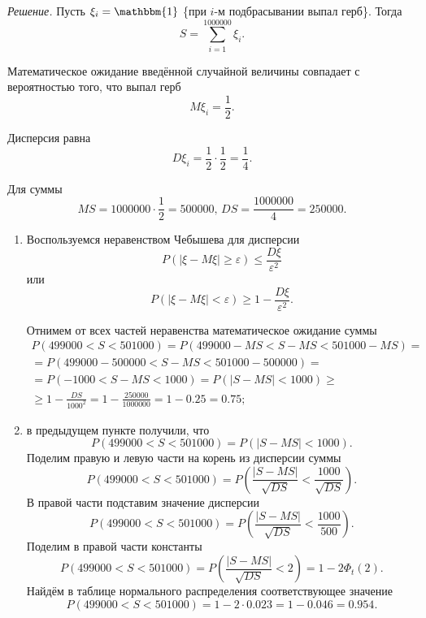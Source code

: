 \textit{Решение.} Пусть $ \xi_i = \mathbbm{1}$ \{при $i$-м подбрасывании выпал герб\}.
Тогда
$$S =
  \sum \limits_{i = 1}^{1000000} \xi_i.$$

Математическое ожидание введённой случайной величины совпадает с вероятностью того, что выпал герб
$$M \xi_i =
  \frac{1}{2}.$$

Дисперсия равна
$$D \xi_i =
  \frac{1}{2} \cdot \frac{1}{2} =
  \frac{1}{4}.$$

Для суммы
$$MS = 1000000 \cdot \frac{1}{2} = 500000, \,
  DS = \frac{1000000}{4} = 250000.$$

\begin{enumerate}[label=\alph*)]
\item Воспользуемся неравенством Чебышева для дисперсии
$$P \left( \left| \xi - M \xi \right| \geq \varepsilon \right) \leq
  \frac{D \xi }{ \varepsilon^2}$$
или
$$P \left( \left| \xi - M \xi \right| < \varepsilon \right) \geq
  1 - \frac{D \xi }{ \varepsilon^2}.$$

Отнимем от всех частей неравенства математическое ожидание суммы
\begin{equation*}
  \begin{split}
    P \left( 499000 < S < 501000 \right) =
    P \left( 499000 - MS < S - MS < 501000 - MS \right) = \\
    = P \left( 499000 - 500000< S - MS < 501000 - 500000 \right) = \\
    = P \left( -1000 < S - MS < 1000 \right) =
    P \left( \left| S - MS \right| < 1000 \right) \geq \\
    \geq 1 - \frac{DS}{1000^2} =
    1 - \frac{250000}{1000000} =
    1 - 0.25 =
    0.75;
  \end{split}
\end{equation*}
\item в предыдущем пункте получили,
что
$$P \left( 499000 < S < 501000 \right) =
  P \left( \left| S - MS \right| < 1000 \right).$$
Поделим правую и левую части на корень из дисперсии суммы
$$P \left( 499000 < S < 501000 \right) =
  P \left( \frac{ \left| S - MS \right| }{ \sqrt{DS}} < \frac{1000}{ \sqrt{DS}} \right).$$
В правой части подставим значение дисперсии
$$P \left( 499000 < S < 501000 \right) =
  P \left( \frac{ \left| S - MS \right| }{ \sqrt{DS}} < \frac{1000}{500} \right).$$
Поделим в правой части константы
$$P \left( 499000 < S < 501000 \right) =
  P \left( \frac{ \left| S - MS \right| }{ \sqrt{DS}} < 2 \right) =
  1 - 2 \Phi_t \left( 2 \right).$$
Найдём в таблице нормального распределения соответствующее значение
$$P \left( 499000 < S < 501000 \right) =
  1 - 2 \cdot 0.023 =
  1 - 0.046 =
  0.954.$$
\end{enumerate}


